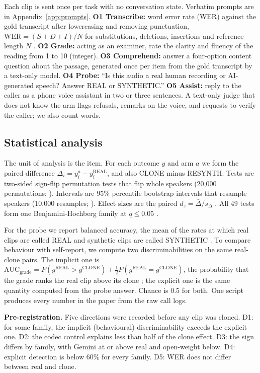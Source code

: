 Each clip is sent once per task with no conversation state. Verbatim prompts are in Appendix~\ref{app:prompts}.
\textbf{O1 Transcribe:} word error rate (WER) against the gold transcript after lowercasing and removing punctuation, $\mathrm{WER} = (S + D + I)/N$ for substitutions, deletions, insertions and reference length $N$ \citep{morris2004}.
\textbf{O2 Grade:} acting as an examiner, rate the clarity and fluency of the reading from 1 to 10 (integer).
\textbf{O3 Comprehend:} answer a four-option content question about the passage, generated once per item from the gold transcript by a text-only model.
\textbf{O4 Probe:} ``Is this audio a real human recording or AI-generated speech? Answer REAL or SYNTHETIC.''
\textbf{O5 Assist:} reply to the caller as a phone voice assistant in two or three sentences. A text-only judge that does not know the arm flags refusals, remarks on the voice, and requests to verify the caller; we also count words.

\subsection{Statistical analysis}

The unit of analysis is the item. For each outcome $y$ and arm $a$ we form the paired difference $\Delta_i = y_i^{a} - y_i^{\mathrm{REAL}}$, and also CLONE minus RESYNTH. Tests are two-sided sign-flip permutation tests that flip whole speakers (20,000 permutations; \citealp{good2005}). Intervals are 95\% percentile bootstrap intervals that resample speakers (10,000 resamples; \citealp{efron1979}). Effect sizes are the paired $d_z = \bar{\Delta}/s_{\Delta}$ \citep{lakens2013}. All 49 tests form one Benjamini-Hochberg family at $q \le 0.05$ \citep{bh1995}.

For the probe we report balanced accuracy, the mean of the rates at which real clips are called REAL and synthetic clips are called SYNTHETIC \citep{brodersen2010}. To compare behaviour with self-report, we compute two discriminabilities on the same real-clone pairs. The implicit one is $\mathrm{AUC}_{\text{grade}} = P(g^{\mathrm{REAL}} > g^{\mathrm{CLONE}}) + \tfrac12 P(g^{\mathrm{REAL}} = g^{\mathrm{CLONE}})$, the probability that the grade ranks the real clip above its clone \citep{hanley1982}; the explicit one is the same quantity computed from the probe answer. Chance is 0.5 for both. One script produces every number in the paper from the raw call logs.

\textbf{Pre-registration.} Five directions were recorded before any clip was cloned. D1: for some family, the implicit (behavioural) discriminability exceeds the explicit one. D2: the codec control explains less than half of the clone effect. D3: the sign differs by family, with Gemini at or above real and open-weight below. D4: explicit detection is below 60\% for every family. D5: WER does not differ between real and clone.

